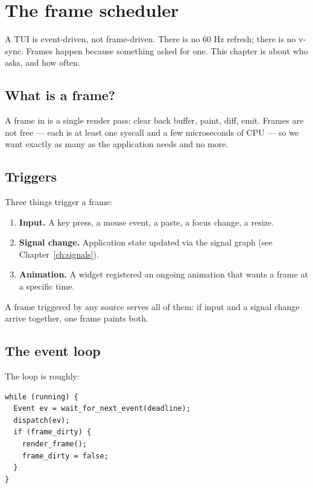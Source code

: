 \chapter{The frame scheduler}
\label{ch:scheduler}

\begin{aside}
A TUI is event-driven, not frame-driven. There is no 60 Hz
refresh; there is no v-sync. Frames happen because something
asked for one. This chapter is about who asks, and how often.
\end{aside}

\section{What is a frame?}

A frame in \maya{} is a single render pass: clear back buffer,
paint, diff, emit. Frames are not free --- each is at least one
 syscall and a few microseconds of CPU --- so we want
exactly as many as the application needs and no more.

\section{Triggers}

Three things trigger a frame:

\begin{enumerate}[leftmargin=*]
  \item \textbf{Input.} A key press, a mouse event, a paste, a
    focus change, a resize.
  \item \textbf{Signal change.} Application state updated via
    the signal graph (see Chapter~\ref{ch:signals}).
  \item \textbf{Animation.} A widget registered an ongoing
    animation that wants a frame at a specific time.
\end{enumerate}

A frame triggered by any source serves all of them: if input and
a signal change arrive together, one frame paints both.

\section{The event loop}

The loop is roughly:

\begin{lstlisting}
while (running) {
  Event ev = wait_for_next_event(deadline);
  dispatch(ev);
  if (frame_dirty) {
    render_frame();
    frame_dirty = false;
  }
}
\end{lstlisting}

